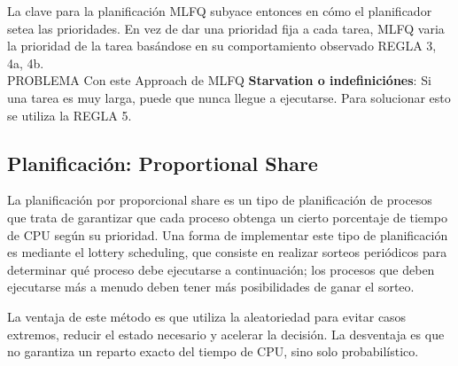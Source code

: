\documentclass[../main.tex]{subfiles}
\begin{document}
        La clave para la planificación MLFQ subyace entonces en cómo el planificador setea las prioridades. En vez de dar una prioridad fija a cada tarea, MLFQ varia la prioridad de la tarea basándose en su comportamiento observado REGLA 3, 4a, 4b.\\

        PROBLEMA Con este Approach de MLFQ \textbf{Starvation o indefiniciónes}: Si una tarea es muy larga, puede que nunca llegue a ejecutarse. Para solucionar esto se utiliza la REGLA 5.

    \subsection{Planificación: Proportional Share}
        La planificación por proporcional share es un tipo de planificación de procesos que trata de garantizar que cada proceso obtenga un cierto porcentaje de tiempo de CPU según su prioridad. Una forma de implementar este tipo de planificación es mediante el lottery scheduling, que consiste en realizar sorteos periódicos para determinar qué proceso debe ejecutarse a continuación; los procesos que deben ejecutarse más a menudo deben tener más posibilidades de ganar el sorteo.

        La ventaja de este método es que utiliza la aleatoriedad para evitar casos extremos, reducir el estado necesario y acelerar la decisión. La desventaja es que no garantiza un reparto exacto del tiempo de CPU, sino solo probabilístico.
\end{document}
